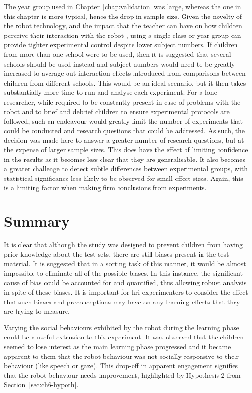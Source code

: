 The year group used in Chapter~\ref{chap:validation} was large, whereas the one in this chapter is more typical, hence the drop in sample size. Given the novelty of the robot technology, and the impact that the teacher can have on how children perceive their interaction with the robot \citep{baxter2015wider}, using a single class or year group can provide tighter experimental control despite lower subject numbers. If children from more than one school were to be used, then it is suggested that several schools should be used instead and subject numbers would need to be greatly increased to average out interaction effects introduced from comparisons between children from different schools. This would be an ideal scenario, but it then takes substantially more time to run and analyse each experiment. For a lone researcher, while required to be constantly present in case of problems with the robot and to brief and debrief children to ensure experimental protocols are followed, such an endeavour would greatly limit the number of experiments that could be conducted and research questions that could be addressed. As such, the decision was made here to answer a greater number of research questions, but at the expense of larger sample sizes. This does have the effect of limiting confidence in the results as it becomes less clear that they are generalisable. It also becomes a greater challenge to detect subtle differences between experimental groups, with statistical significance less likely to be observed for small effect sizes. Again, this is a limiting factor when making firm conclusions from experiments.

\section{Summary} \label{sec:ch6-embodiment-summary}
It is clear that although the study was designed to prevent children from having prior knowledge about the test sets, there are still biases present in the test material. It is suggested that in a sorting task of this manner, it would be almost impossible to eliminate all of the possible biases. In this instance, the significant cause of bias could be accounted for and quantified, thus allowing robust analysis in spite of these biases. It is important for \acrshort{hri} experimenters to consider the effect that such biases and preconceptions may have on any learning effects that they are trying to measure. 

Varying the social behaviours exhibited by the robot during the learning phase could be a useful extension to this experiment. It was observed that the children seemed to lose interest as the main learning phase progressed and it became apparent to them that the robot behaviour was not socially responsive to their behaviour (like speech or gaze). This drop-off in apparent engagement signifies that the robot behaviour needs improvement, highlighted by Hypothesis 2 from Section~\ref{sec:ch6-hypoth}.

